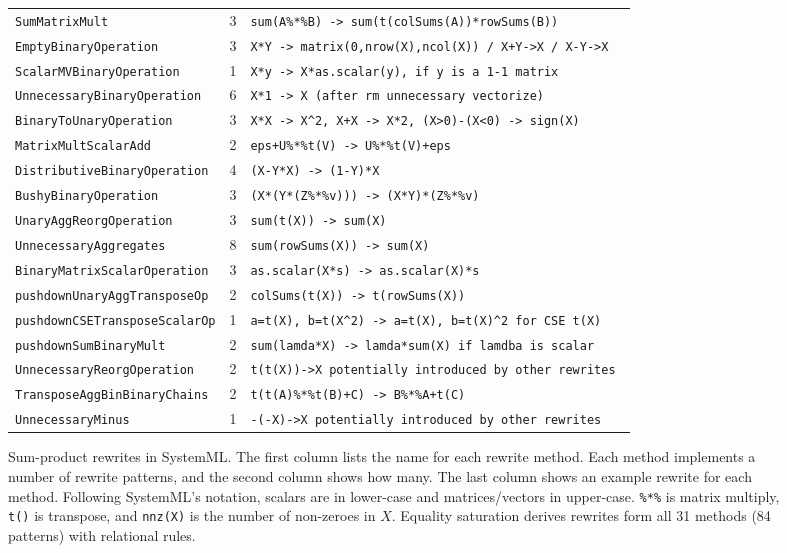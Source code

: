 \begin{figure}
\begin{tabular}{|l|c|l|}
\verb|SumMatrixMult| & 3 & \verb|sum(A%*%B) -> sum(t(colSums(A))*rowSums(B)) |\\
\verb|EmptyBinaryOperation| & 3 & \verb|X*Y -> matrix(0,nrow(X),ncol(X)) / X+Y->X / X-Y->X |\\
\verb|ScalarMVBinaryOperation| & 1 & \verb|X*y -> X*as.scalar(y), if y is a 1-1 matrix |\\
\verb|UnnecessaryBinaryOperation| & 6 & \verb|X*1 -> X (after rm unnecessary vectorize) |\\
\verb|BinaryToUnaryOperation| & 3 & \verb|X*X -> X^2, X+X -> X*2, (X>0)-(X<0) -> sign(X) |\\
\verb|MatrixMultScalarAdd| & 2 & \verb|eps+U%*%t(V) -> U%*%t(V)+eps|\\
\verb|DistributiveBinaryOperation| & 4 & \verb|(X-Y*X) -> (1-Y)*X |\\
\verb|BushyBinaryOperation| & 3 & \verb|(X*(Y*(Z%*%v))) -> (X*Y)*(Z%*%v) |\\
\verb|UnaryAggReorgOperation| & 3 & \verb|sum(t(X)) -> sum(X) |\\
\verb|UnnecessaryAggregates| & 8 & \verb|sum(rowSums(X)) -> sum(X) |\\
\verb|BinaryMatrixScalarOperation| & 3 & \verb|as.scalar(X*s) -> as.scalar(X)*s |\\

\verb|pushdownUnaryAggTransposeOp| & 2 & \verb|colSums(t(X)) -> t(rowSums(X)) |\\
\verb|pushdownCSETransposeScalarOp| & 1 & \verb|a=t(X), b=t(X^2) -> a=t(X), b=t(X)^2 for CSE t(X) |\\

\verb|pushdownSumBinaryMult| & 2 & \verb|sum(lamda*X) -> lamda*sum(X) if lamdba is scalar|\\
\verb|UnnecessaryReorgOperation| & 2 & \verb|t(t(X))->X potentially introduced by other rewrites |\\
\verb|TransposeAggBinBinaryChains| & 2 & \verb|t(t(A)%*%t(B)+C) -> B%*%A+t(C) |\\
\verb|UnnecessaryMinus| & 1 & \verb|-(-X)->X potentially introduced by other rewrites |\\
\hline
\end{tabular}{}
    \caption{Sum-product rewrites in SystemML. The first column lists the name for each rewrite method. Each 
    method implements a number of rewrite patterns, and the second column shows how many. The last column shows an example rewrite for each method. Following SystemML's notation, scalars are in lower-case and matrices/vectors in upper-case. \texttt{\%*\%} is matrix multiply,  \texttt{t()} is transpose, and \texttt{nnz(X)} is the number of non-zeroes in $X$. 
    Equality saturation derives rewrites form all 31 methods (84 patterns) with relational  rules. }
    \label{rewritecomplete}
\end{figure}{}

